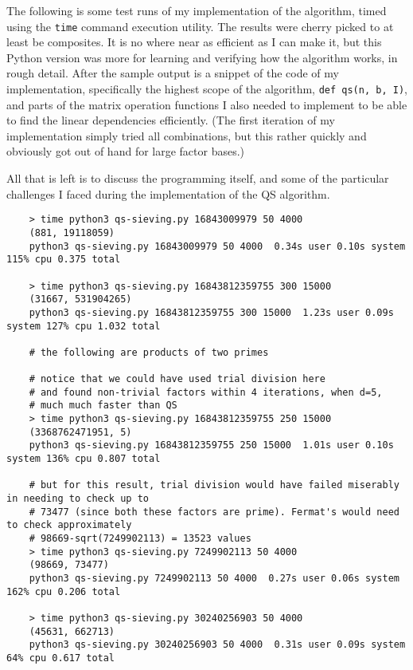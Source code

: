 \documentclass{report}
\begin{document}
The following is some test runs of my implementation of the algorithm, timed using the
\texttt{time} command execution utility. The results were cherry picked to at least
be composites.
It is no where near as efficient as I can make it, but this Python version was more for learning
and verifying how the algorithm works, in rough detail.
After the sample output is a snippet of the code of my implementation, specifically the highest
scope of the algorithm, \texttt{def qs(n, b, I)}, and parts of the matrix operation
functions I also needed to implement to be able to find the linear dependencies efficiently.
(The first iteration of my implementation simply tried all combinations, but this rather quickly
and obviously got out of hand for large factor bases.)

All that is left is to discuss the programming itself, and some of the particular challenges I faced
during the implementation of the QS algorithm.
\begin{verbatim}
    > time python3 qs-sieving.py 16843009979 50 4000
    (881, 19118059)
    python3 qs-sieving.py 16843009979 50 4000  0.34s user 0.10s system 115% cpu 0.375 total

    > time python3 qs-sieving.py 16843812359755 300 15000
    (31667, 531904265)
    python3 qs-sieving.py 16843812359755 300 15000  1.23s user 0.09s system 127% cpu 1.032 total

    # the following are products of two primes

    # notice that we could have used trial division here
    # and found non-trivial factors within 4 iterations, when d=5,
    # much much faster than QS
    > time python3 qs-sieving.py 16843812359755 250 15000
    (3368762471951, 5)
    python3 qs-sieving.py 16843812359755 250 15000  1.01s user 0.10s system 136% cpu 0.807 total

    # but for this result, trial division would have failed miserably in needing to check up to
    # 73477 (since both these factors are prime). Fermat's would need to check approximately
    # 98669-sqrt(7249902113) = 13523 values
    > time python3 qs-sieving.py 7249902113 50 4000
    (98669, 73477)
    python3 qs-sieving.py 7249902113 50 4000  0.27s user 0.06s system 162% cpu 0.206 total

    > time python3 qs-sieving.py 30240256903 50 4000
    (45631, 662713)
    python3 qs-sieving.py 30240256903 50 4000  0.31s user 0.09s system 64% cpu 0.617 total
\end{verbatim}
\pagebreak
\end{document}
